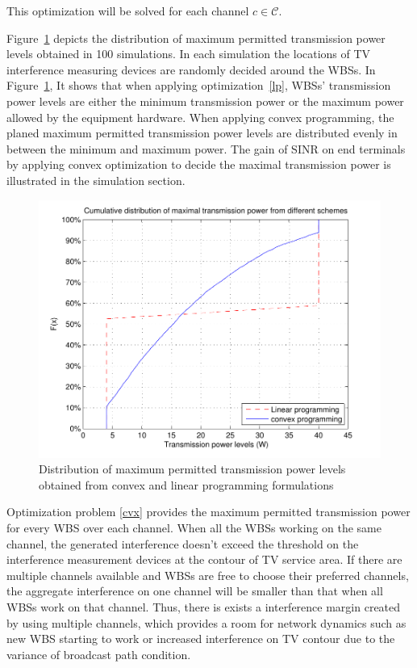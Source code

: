 \documentclass[times]{ettauth}
\theoremstyle{mytheoremstyle}
\theoremstyle{mytheoremstyle}
\theoremstyle{mytheoremstyle}
\begin{document}
This optimization will be solved for each channel $c\in \mathcal{C}$.

Figure~\ref{lpcvx} depicts the distribution of maximum permitted transmission power levels obtained in 100 simulations.
In each simulation the locations of TV interference measuring devices are randomly decided around the WBSs.
In Figure~\ref{lpcvx}, It shows that when applying optimization~\ref{lp}, WBSs' transmission power levels are either the minimum transmission power or the maximum power allowed by the equipment hardware.
When applying convex programming, the planed maximum permitted transmission power levels are distributed evenly in between the minimum and maximum power.
The gain of SINR on end terminals by applying convex optimization to decide the maximal transmission power is illustrated in the simulation section.

\begin{figure}[h!]
  \centering
  \includegraphics[width=0.89\linewidth]{lpcvxcdf100runs.pdf}
  \caption{Distribution of maximum permitted transmission power levels obtained from convex and linear programming formulations}
\label{lpcvx}
\end{figure}


Optimization problem \ref{cvx} provides the maximum permitted transmission power for every WBS over each channel.
When all the WBSs working on the same channel, the generated interference doesn't exceed the threshold on the interference measurement devices at the contour of TV service area. 
If there are multiple channels available and WBSs are free to choose their preferred channels, the aggregate interference on one channel will be smaller than that when all WBSs work on that channel. 
Thus, there is exists a interference margin created by using multiple channels, which provides a room for network dynamics such as new WBS starting to work or increased interference on TV contour due to the variance of broadcast path condition. 
\end{document}
